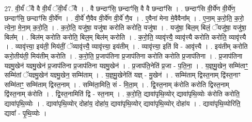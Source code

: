\documentclass[17pt]{extarticle}
\begin{document}
27. वी॒र्यं॑ ॅवै वै वी॒र्यं॑ ॅवी॒र्यं॑ ॅवै । . वै छन्दाꣳ॑सि॒ छन्दाꣳ॑सि॒ वै वै छन्दाꣳ॑सि । . छन्दाꣳ॑सि वी॒र्ये॑ण वी॒र्ये॑ण॒ छन्दाꣳ॑सि॒ छन्दाꣳ॑सि वी॒र्ये॑ण । . वी॒र्ये॑ णै॒वैव वी॒र्ये॑ण वी॒र्ये॑ णै॒व । . ए॒वैना॑ मेना मे॒वैवैना᳚म् । . ए॒ना॒म् क॒रो॒ति॒ क॒रो॒ त्ये॒ना॒ मे॒ना॒म् क॒रो॒ति॒ । . क॒रो॒ति॒ यजु॑षा॒ यजु॑षा करोति करोति॒ यजु॑षा । . यजु॑षा॒ बिल॒म् बिलं॒ ॅयजु॑षा॒ यजु॑षा॒ बिल᳚म् । . बिल॑म् करोति करोति॒ बिल॒म् बिल॑म् करोति । . क॒रो॒ति॒ व्यावृ॑त्त्यै॒ व्यावृ॑त्त्यै करोति करोति॒ व्यावृ॑त्त्यै । . व्यावृ॑त्त्या॒ इय॑ती॒ मिय॑तीं॒ ॅव्यावृ॑त्त्यै॒ व्यावृ॑त्त्या॒ इय॑तीम् । . व्यावृ॑त्त्या॒ इति॑ वि - आवृ॑त्त्यै । . इय॑तीम् करोति करो॒तीय॑ती॒ मिय॑तीम् करोति । . क॒रो॒ति॒ प्र॒जाप॑तिना प्र॒जाप॑तिना करोति करोति प्र॒जाप॑तिना । . प्र॒जाप॑तिना यज्ञ्मु॒खेन॑ यज्ञ्मु॒खेन॑ प्र॒जाप॑तिना प्र॒जाप॑तिना यज्ञ्मु॒खेन॑ । . प्र॒जाप॑ति॒नेति॑ प्र॒जा - प॒ति॒ना॒ । . य॒ज्ञ्॒मु॒खेन॒ सम्मि॑ताꣳ॒॒ सम्मि॑तां ॅयज्ञ्मु॒खेन॑ यज्ञ्मु॒खेन॒ सम्मि॑ताम् । . य॒ज्ञ्॒मु॒खेनेति॑ यज्ञ् - मु॒खेन॑ । . सम्मि॑ताम् द्विस्त॒नाम् द्वि॑स्त॒नाꣳ सम्मि॑ताꣳ॒॒ सम्मि॑ताम् द्विस्त॒नाम् । . सम्मि॑ता॒मिति॒ सं - मि॒ता॒म् । . द्वि॒स्त॒नाम् क॑रोति करोति द्विस्त॒नाम् द्वि॑स्त॒नाम् क॑रोति । . द्वि॒स्त॒नामिति॑ द्वि - स्त॒नाम् । . क॒रो॒ति॒ द्यावा॑पृथि॒व्योर् द्यावा॑पृथि॒व्योः क॑रोति करोति॒ द्यावा॑पृथि॒व्योः । . द्यावा॑पृथि॒व्योर् दोहा॑य॒ दोहा॑य॒ द्यावा॑पृथि॒व्योर् द्यावा॑पृथि॒व्योर् दोहा॑य । . द्यावा॑पृथि॒व्योरिति॒ द्यावा᳚ - पृ॒थि॒व्योः । \newline
\end{document}
